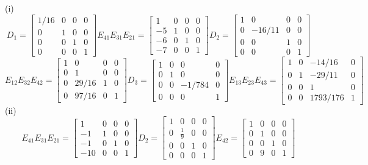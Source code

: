 \documentclass{article}
\begin{document}
(i)
\[ D_1=\begin{bmatrix}
     1/16 & 0 & 0 & 0 \\ 0 & 1 & 0 & 0 \\ 0 & 0 & 1 & 0 \\ 0 & 0 & 0 & 1
     \end{bmatrix} E_{41}E_{31}E_{21}=\begin{bmatrix} 1 & 0 & 0 & 0 \\ -5 & 1 & 0 & 0 \\ -6 & 0 & 1 & 0 \\ -7 & 0 & 0 & 1 \end{bmatrix} 
     D_2=\begin{bmatrix} 1 & 0 & 0 & 0 \\ 0 & -16/11 & 0 & 0 \\ 0 & 0 & 1 & 0 \\ 0 & 0 & 0 & 1 \end{bmatrix} \]
     \[ E_{12}E_{32}E_{42}=\begin{bmatrix} 1 & 0 & 0 & 0 \\ 0 & 1 & 0 & 0 \\ 0 & 29/16 & 1 & 0 \\ 0 & 97/16 & 0 & 1 \end{bmatrix} 
 D_3=\begin{bmatrix} 1 & 0 & 0 & 0 \\ 0 & 1 & 0 & 0 \\ 0 & 0 & -1/784 & 0 \\ 0 & 0 & 0 & 1 \end{bmatrix} 
 E_{13}E_{23}E_{43}=\begin{bmatrix} 1 & 0 & -14/16 & 0 \\ 0 & 1 & -29/11 & 0 \\ 0 & 0 & 1 & 0 \\ 0 & 0 & 1793/176 & 1 \end{bmatrix} \]
(ii)
\[
E_{41} E_{31}E_{21}= \begin{bmatrix}
    1 & 0 & 0 & 0\\
    -1 & 1 & 0 & 0\\
    -1 & 0 & 1 & 0\\
    -10 & 0 & 0 & 1
\end{bmatrix}
D_2 = \begin{bmatrix}
    1 & 0 & 0 & 0\\
    0 & \frac{1}{9} & 0 & 0\\
    0 & 0 & 1 & 0\\
    0 & 0 & 0 & 1
\end{bmatrix}
E_{42} = \begin{bmatrix}
    1 & 0 & 0 & 0\\
    0 & 1 & 0 & 0\\
    0 & 0 & 1 & 0\\
    0 & 9 & 0 & 1
\end{bmatrix}
\]
\end{document}
